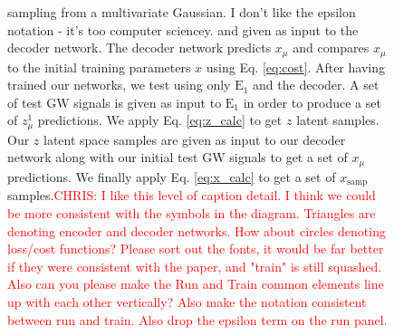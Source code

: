 \documentclass[%
showpacs,
 amsmath,amssymb,
 aps,
 twocolumn,
 prl,
 reprint,
floatfix,
]{revtex4-1}
\newcommand{\chris}[1]{\textcolor{red}{CHRIS: #1}}
\begin{document}
\begin{figure}
{{sampling from a multivariate Gaussian. I don't like the epsilon notation - it's
too computer sciencey.} and given as input to the decoder network. The decoder
network predicts $x_{\mu}$ and compares $x_{\mu}$ to the initial training
parameters $x$ using Eq. \ref{eq:cost}. After having trained our networks, we
test using only $\textrm{E}_1$ and the decoder. A set of test GW signals is
given as input to $\textrm{E}_1$ in order to produce a set of $z^1_{\mu}$
predictions.  We apply Eq. \ref{eq:z_calc} to get $z$ latent samples. Our $z$
latent space samples are given as input to our decoder network along with our
initial test GW signals to get a set of $x_{\mu}$ predictions. We finally apply
Eq.  \ref{eq:x_calc} to get a set of $x_\textrm{samp}$ samples.\chris{I like
this level of caption detail. I think we could be more consistent with the
symbols in the diagram. Triangles are denoting encoder and decoder networks.
How about circles denoting loss/cost functions? Please sort out the fonts, it
would be far better if they were consistent with the paper, and "train" is
still squashed. Also can you please make the Run and Train common elements line
up with each other vertically? Also make the notation consistent between run
and train. Also drop the epsilon term on the run panel.}} 
\end{figure}
\end{document}
